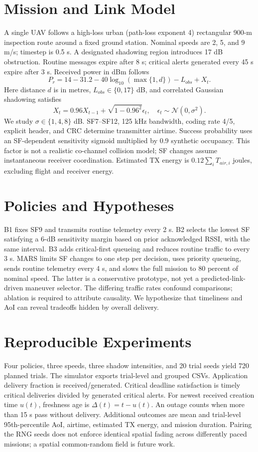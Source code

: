 \documentclass[conference]{IEEEtran}
\begin{document}
\section{Mission and Link Model}
A single UAV follows a high-loss urban (path-loss exponent 4) rectangular 900-m inspection route around a fixed ground station. Nominal speeds are 2, 5, and 9 m/s; timestep is 0.5 s. A designated shadowing region introduces 17 dB obstruction. Routine messages expire after 8 s; critical alerts generated every 45 s expire after 3 s.
Received power in dBm follows
\begin{equation}P_r=14-31.2-40\log_{10}(\max\{1,d\})-L_{obs}+X_t.\end{equation}
Here distance $d$ is in metres, $L_{obs}\in\{0,17\}$ dB, and correlated Gaussian shadowing satisfies
\begin{equation}X_t=0.96X_{t-1}+\sqrt{1-0.96^2}\epsilon_t,\quad\epsilon_t\sim\mathcal N(0,\sigma^2).\end{equation}
We study $\sigma\in\{1,4,8\}$ dB. SF7--SF12, 125 kHz bandwidth, coding rate 4/5, explicit header, and CRC determine transmitter airtime. Success probability uses an SF-dependent sensitivity sigmoid multiplied by 0.9 synthetic occupancy. This factor is not a realistic co-channel collision model; SF changes assume instantaneous receiver coordination. Estimated TX energy is $0.12\sum_i T_{air,i}$ joules, excluding flight and receiver energy.
\section{Policies and Hypotheses}
B1 fixes SF9 and transmits routine telemetry every 2 s. B2 selects the lowest SF satisfying a 6-dB sensitivity margin based on prior acknowledged RSSI, with the same interval. B3 adds critical-first queueing and reduces routine traffic to every 3 s. MARS limits SF changes to one step per decision, uses priority queueing, sends routine telemetry every 4 s, and slows the full mission to 80 percent of nominal speed. The latter is a conservative prototype, not yet a predicted-link-driven maneuver selector. The differing traffic rates confound comparisons; ablation is required to attribute causality. We hypothesize that timeliness and AoI can reveal tradeoffs hidden by overall delivery.
\section{Reproducible Experiments}
Four policies, three speeds, three shadow intensities, and 20 trial seeds yield 720 planned trials. The simulator exports trial-level and grouped CSVs. Application delivery fraction is received/generated. Critical deadline satisfaction is timely critical deliveries divided by generated critical alerts. For newest received creation time $u(t)$, freshness age is $\Delta(t)=t-u(t)$. An outage counts when more than 15 s pass without delivery. Additional outcomes are mean and trial-level 95th-percentile AoI, airtime, estimated TX energy, and mission duration. Pairing the RNG seeds does not enforce identical spatial fading across differently paced missions; a spatial common-random field is future work.
\end{document}
